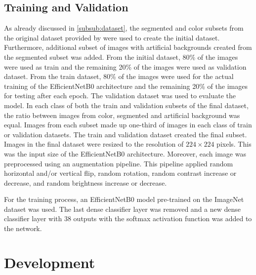 \documentclass{BachelorBUI}
\begin{document}
    \subsection{Training and Validation}
    As already discussed in \autoref{subsub:dataset}, the segmented and color subsets from the original dataset provided by \textcite{Mohanty:2016} were used to create the initial dataset. Furthermore, additional subset of images with artificial backgrounds created from the segmented subset was added. From the initial dataset, 80\% of the images were used as train and the remaining 20\% of the images were used as validation dataset. From the train dataset, 80\% of the images were used for the actual training of the EfficientNetB0 architecture and the remaining 20\% of the images for testing after each epoch. The validation dataset was used to evaluate the model. In each class of both the train and validation subsets of the final dataset, the ratio between images from color, segmented and artificial background was equal. Images from each subset made up one-third of images in each class of train or validation datasets. The train and validation dataset created the final subset. Images in the final dataset were resized to the resolution of $224 \times 224$ pixels. This was the input size of the EfficientNetB0 architecture. Moreover, each image was preprocessed using an augmentation pipeline. This pipeline applied  random horizontal and/or vertical flip, random rotation, random contrast increase or decrease, and random brightness increase or decrease.

    For the training process, an EfficientNetB0 model pre-trained on the ImageNet dataset was used. The last dense classifier layer was removed and a new dense classifier layer with 38 outputs with the softmax activation function was added to the network.

\section{Development}
\end{document}
